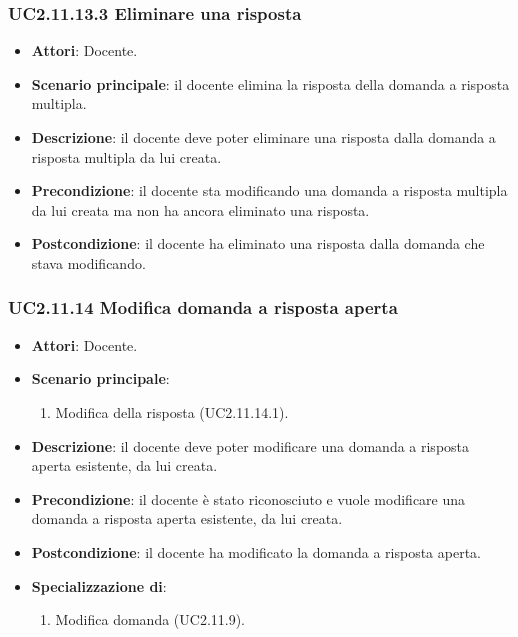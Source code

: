 \subsubsection{UC2.11.13.3 Eliminare una risposta}
\begin{itemize}
\item \textbf{Attori}: Docente.
\item \textbf{Scenario principale}: il docente elimina la risposta della domanda a risposta multipla.
\item \textbf{Descrizione}: il docente deve poter eliminare una risposta dalla domanda a risposta multipla da lui creata.
\item \textbf{Precondizione}: il docente sta modificando una domanda a risposta multipla da lui creata ma non ha ancora eliminato una risposta.
\item \textbf{Postcondizione}: il docente ha eliminato una risposta dalla domanda che stava modificando.
\end{itemize}
\subsubsection{UC2.11.14 Modifica domanda a risposta aperta}
\begin{itemize}
\item \textbf{Attori}: Docente.
\item \textbf{Scenario principale}:
\begin{enumerate}
\item Modifica della risposta (UC2.11.14.1).
\end{enumerate}
\item \textbf{Descrizione}: il docente deve poter modificare una domanda a risposta aperta esistente, da lui creata.
\item \textbf{Precondizione}: il docente è stato riconosciuto e vuole modificare una domanda a risposta aperta esistente, da lui creata.
\item \textbf{Postcondizione}: il docente ha modificato la domanda a risposta aperta.
\item \textbf{Specializzazione di}:
\begin{enumerate}
\item Modifica domanda (UC2.11.9).
\end{enumerate}
\end{itemize}

